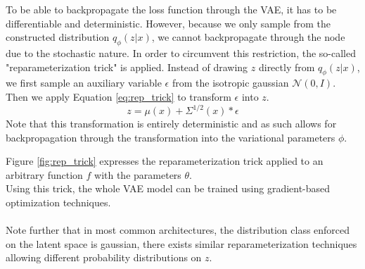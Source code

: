 To be able to backpropagate the loss function through the VAE, it has to be differentiable and deterministic.
However, because we only sample from the constructed distribution $q_\phi(z|x)$, we cannot backpropagate through the node due to the stochastic nature.
In order to circumvent this restriction, the so-called "reparameterization trick" is applied.
Instead of drawing $z$ directly from $q_\phi(z|x)$, we first sample an auxiliary variable $\epsilon$ from the isotropic gaussian $\mathcal{N}(0, I)$. Then we apply Equation \ref{eq:rep_trick} to transform $\epsilon$ into $z$.
\begin{equation}
  \label{eq:rep_trick}
  z = \mu(x) + \Sigma^{1/2}(x)*\epsilon
\end{equation}
Note that this transformation is entirely deterministic and as such allows for backpropagation through the transformation into the variational parameters $\phi$.

Figure \ref{fig:rep_trick} expresses the reparameterization trick applied to an arbitrary function $f$ with the parameters $\theta$.\\
Using this trick, the whole VAE model can be trained using gradient-based optimization techniques.\\\\

Note further that in most common architectures, the distribution class enforced on the latent space is gaussian, there exists similar reparameterization techniques allowing different probability distributions on $z$.








